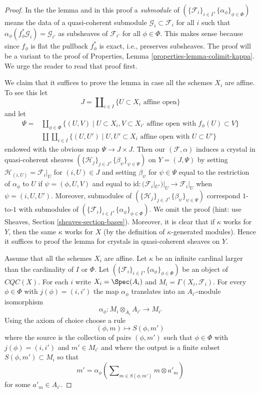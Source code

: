 \begin{proof}
In the the lemma and in this proof a {\it submodule} of
$(\{\mathcal{F}_i\}_{i \in I}, \{\alpha_\phi\}_{\phi \in \Phi})$
means the data of a quasi-coherent submodule
$\mathcal{G}_i \subset \mathcal{F}_i$ for all $i$ such that
$\alpha_\phi(f_\phi^*\mathcal{G}_i) = \mathcal{G}_{i'}$
as subsheaves of $\mathcal{F}_{i'}$ for all $\phi \in \Phi$.
This makes sense because since $f_\phi$ is flat the
pullback $f^*_\phi$ is exact, i.e., preserves subsheaves.
The proof will be a variant to the proof of
Properties, Lemma \ref{properties-lemma-colimit-kappa}.
We urge the reader to read that proof first.

\medskip\noindent
We claim that it suffices to prove the lemma in case all the schemes
$X_i$ are affine. To see this let
$$
J = \coprod\nolimits_{i \in I} \{U \subset X_i\text{ affine open}\}
$$
and let
\begin{align*}
\Psi = & \coprod\nolimits_{\phi \in \Phi}
\{
(U, V) \mid
U \subset X_i, V \subset X_{i'}\text{ affine open with } f_\phi(U) \subset V
\} \\
&
\coprod \coprod\nolimits_{i \in I}
\{
(U, U') \mid
U, U' \subset X_i\text{ affine open with } U \subset U'
\}
\end{align*}
endowed with the obvious map $\Psi \to J \times J$. Then our
$(\mathcal{F}, \alpha)$ induces a crystal in quasi-coherent sheaves
$(\{\mathcal{H}_j\}_{j \in J}, \{\beta_\psi\}_{\psi \in \Psi})$
on $Y = (J, \Psi)$ by setting $\mathcal{H}_{(i, U)} = \mathcal{F}_i|_U$
for $(i, U) \in J$ and setting $\beta_\psi$ for $\psi \in \Psi$
equal to the restriction of $\alpha_\phi$ to $U$
if $\psi = (\phi, U, V)$ and
equal to $\text{id} : (\mathcal{F}_i|_{U'})|_U \to \mathcal{F}_i|_U$
when $\psi = (i, U, U')$. Moreover, submodules of
$(\{\mathcal{H}_j\}_{j \in J}, \{\beta_\psi\}_{\psi \in \Psi})$
correspond $1$-to-$1$ with submodules of
$(\{\mathcal{F}_i\}_{i \in I}, \{\alpha_\phi\}_{\phi \in \Phi})$.
We omit the proof (hint: use
Sheaves, Section \ref{sheaves-section-bases}).
Moreover, it is clear that if $\kappa$ works for $Y$, then
the same $\kappa$ works for $X$ (by the definition of $\kappa$-generated
modules). Hence it suffices to proof the lemma for crystals in
quasi-coherent sheaves on $Y$.

\medskip\noindent
Assume that all the schemes $X_i$ are affine. Let $\kappa$ be an infinite
cardinal larger than the cardinality of $I$ or $\Phi$. Let
$(\{\mathcal{F}_i\}_{i \in I}, \{\alpha_\phi\}_{\phi \in \Phi})$
be an object of $\textit{CQC}(X)$. For each $i$ write
$X_i = \Spec(A_i)$ and $M_i = \Gamma(X_i, \mathcal{F}_i)$.
For every $\phi \in \Phi$ with $j(\phi) = (i, i')$ the map
$\alpha_\phi$ translates into an $A_{i'}$-module isomorphism
$$
\alpha_\phi : M_i \otimes_{A_i} A_{i'} \longrightarrow M_{i'}
$$
Using the axiom of choice choose a rule
$$
(\phi, m) \longmapsto S(\phi, m')
$$
where the source is the collection of pairs $(\phi, m')$ such that
$\phi \in \Phi$ with $j(\phi) = (i, i')$ and $m' \in M_{i'}$ and
where the output is a finite subset $S(\phi, m') \subset M_i$ so that
$$
m' = \alpha_\phi\left(\sum\nolimits_{m \in S(\phi, m')} m \otimes a'_m\right)
$$
for some $a'_m \in A_{i'}$.


\end{proof}
